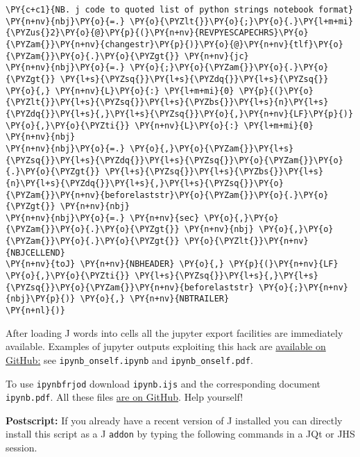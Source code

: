 \begin{tcolorbox}[breakable, size=fbox, boxrule=1pt, pad at break*=1mm,colback=cellbackground, colframe=cellborder]
\begin{Verbatim}[commandchars=\\\{\}]
\PY{c+c1}{NB. j code to quoted list of python strings notebook format}
\PY{n+nv}{nbj}\PY{o}{=.} \PY{o}{\PYZlt{}}\PY{o}{;}\PY{o}{.}\PY{l+m+mi}{\PYZus{}2}\PY{o}{@}\PY{p}{(}\PY{n+nv}{REVPYESCAPECHRS}\PY{o}{\PYZam{}}\PY{n+nv}{changestr}\PY{p}{)}\PY{o}{@}\PY{n+nv}{tlf}\PY{o}{\PYZam{}}\PY{o}{.}\PY{o}{\PYZgt{}} \PY{n+nv}{jc}
\PY{n+nv}{nbj}\PY{o}{=.} \PY{o}{;}\PY{o}{\PYZam{}}\PY{o}{.}\PY{o}{\PYZgt{}} \PY{l+s}{\PYZsq{}}\PY{l+s}{\PYZdq{}}\PY{l+s}{\PYZsq{}} \PY{o}{,} \PY{n+nv}{L}\PY{o}{:} \PY{l+m+mi}{0} \PY{p}{(}\PY{o}{\PYZlt{}}\PY{l+s}{\PYZsq{}}\PY{l+s}{\PYZbs{}}\PY{l+s}{n}\PY{l+s}{\PYZdq{}}\PY{l+s}{,}\PY{l+s}{\PYZsq{}}\PY{o}{,}\PY{n+nv}{LF}\PY{p}{)} \PY{o}{,}\PY{o}{\PYZti{}} \PY{n+nv}{L}\PY{o}{:} \PY{l+m+mi}{0} \PY{n+nv}{nbj}
\PY{n+nv}{nbj}\PY{o}{=.} \PY{o}{,}\PY{o}{\PYZam{}}\PY{l+s}{\PYZsq{}}\PY{l+s}{\PYZdq{}}\PY{l+s}{\PYZsq{}}\PY{o}{\PYZam{}}\PY{o}{.}\PY{o}{\PYZgt{}} \PY{l+s}{\PYZsq{}}\PY{l+s}{\PYZbs{}}\PY{l+s}{n}\PY{l+s}{\PYZdq{}}\PY{l+s}{,}\PY{l+s}{\PYZsq{}}\PY{o}{\PYZam{}}\PY{n+nv}{beforelaststr}\PY{o}{\PYZam{}}\PY{o}{.}\PY{o}{\PYZgt{}} \PY{n+nv}{nbj}
\PY{n+nv}{nbj}\PY{o}{=.} \PY{n+nv}{sec} \PY{o}{,}\PY{o}{\PYZam{}}\PY{o}{.}\PY{o}{\PYZgt{}} \PY{n+nv}{nbj} \PY{o}{,}\PY{o}{\PYZam{}}\PY{o}{.}\PY{o}{\PYZgt{}} \PY{o}{\PYZlt{}}\PY{n+nv}{NBJCELLEND}
\PY{n+nv}{toJ} \PY{n+nv}{NBHEADER} \PY{o}{,} \PY{p}{(}\PY{n+nv}{LF} \PY{o}{,}\PY{o}{\PYZti{}} \PY{l+s}{\PYZsq{}}\PY{l+s}{,}\PY{l+s}{\PYZsq{}}\PY{o}{\PYZam{}}\PY{n+nv}{beforelaststr} \PY{o}{;}\PY{n+nv}{nbj}\PY{p}{)} \PY{o}{,} \PY{n+nv}{NBTRAILER}
\PY{n+nl}{)}
\end{Verbatim}
\end{tcolorbox}

After loading J words into cells all the jupyter export facilities are
immediately available. Examples of jupyter outputs exploiting this hack
are \href{https://github.com/bakerjd99/jacks/tree/master/ipynbfrjod}{available on GitHub:} see \texttt{ipynb\_onself.ipynb} and \texttt{ipynb\_onself.pdf}.

To use \texttt{ipynbfrjod} download \texttt{ipynb.ijs}
and the corresponding document \texttt{ipynb.pdf}.
All these files \href{https://github.com/bakerjd99/jacks/tree/master/ipynbfrjod}{are on
GitHub}. Help yourself!


 \textbf{Postscript:} If you already have a recent version of J installed
you can directly install this script as a J \texttt{addon} by typing the
following commands in a JQt or JHS session.

